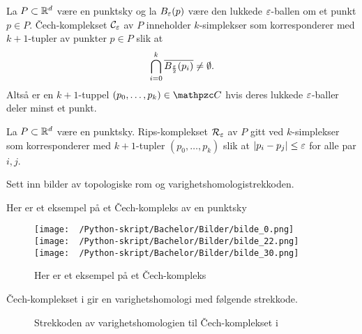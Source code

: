 \begin{definisjon}\label{def:CechKomp}
  La $P\subset\mathbb{R}^d$ være en punktsky og la $B_\varepsilon(p)$ være den
  lukkede $\varepsilon$-ballen om et punkt $p\in P$. Čech-komplekset
  $\mathcal{C}_\varepsilon$ av $P$ inneholder $k$-simplekser som korresponderer
  med $k+1$-tupler av punkter $p\in P$ slik at
  \[\bigcap_{i=0}^k \overline{B_\frac{\varepsilon}{2}(p_i)}\neq\emptyset.\]
  Altså er en $k+1$-tuppel $(p_0,\dots,p_k)\in\Cpzc$ hvis deres
  lukkede $\varepsilon$-baller deler minst et punkt.
\end{definisjon}

\begin{definisjon}\label{def:RipsKomp}
  La $P\subset\mathbb{R}^d$ være en punktsky. Rips-komplekset
  $\mathcal{R}_\varepsilon$ av $P$ gitt ved $k$-simplekser som korresponderer
  med $k+1$-tupler $(p_0,\dots,p_k)$ slik at $|p_i-p_j|\leq\varepsilon$
  for alle par $i,j$.
\end{definisjon}

Sett inn bilder av topologiske rom og varighetshomologistrekkoden.

Her er et eksempel på et Čech-kompleks av en punktsky
\begin{figure}[h!]
  \centering
  \texttt{[image: ~/Python-skript/Bachelor/Bilder/bilde\_0.png]}
  \texttt{[image: ~/Python-skript/Bachelor/Bilder/bilde\_22.png]}
  \texttt{[image: ~/Python-skript/Bachelor/Bilder/bilde\_30.png]}
  \caption{Her er et eksempel på et Čech-kompleks}
  \label{fig:cechkomp}
\end{figure}

Čech-komplekset i  gir en
varighetshomologi med følgende strekkode.
\begin{figure}[h!]
  \centering
  \scalebox{0.5}{}
  \caption{Strekkoden av varighetshomologien til
  Čech-komplekset i }
  \label{fig:chechstrek}
\end{figure}
